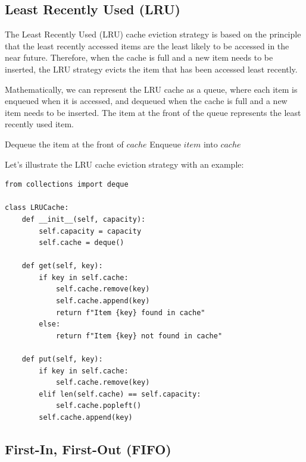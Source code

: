 \documentclass[12pt]{book} %
\begin{document}
\subsection{Least Recently Used (LRU)}

The Least Recently Used (LRU) cache eviction strategy is based on the principle that the least recently accessed items are the least likely to be accessed in the near future. Therefore, when the cache is full and a new item needs to be inserted, the LRU strategy evicts the item that has been accessed least recently.

Mathematically, we can represent the LRU cache as a queue, where each item is enqueued when it is accessed, and dequeued when the cache is full and a new item needs to be inserted. The item at the front of the queue represents the least recently used item.
\FloatBarrier
\begin{algorithm}
\caption{LRU Cache Eviction}
\begin{algorithmic}[1]
        \State Dequeue the item at the front of $cache$
    \EndIf
    \State Enqueue $item$ into $cache$
\EndFunction
\end{algorithmic}
\end{algorithm}
\FloatBarrier
Let's illustrate the LRU cache eviction strategy with an example:
\FloatBarrier
\begin{lstlisting}
from collections import deque

class LRUCache:
    def __init__(self, capacity):
        self.capacity = capacity
        self.cache = deque()

    def get(self, key):
        if key in self.cache:
            self.cache.remove(key)
            self.cache.append(key)
            return f"Item {key} found in cache"
        else:
            return f"Item {key} not found in cache"

    def put(self, key):
        if key in self.cache:
            self.cache.remove(key)
        elif len(self.cache) == self.capacity:
            self.cache.popleft()
        self.cache.append(key)
\end{lstlisting}
\FloatBarrier

\subsection{First-In, First-Out (FIFO)}
\end{document}
